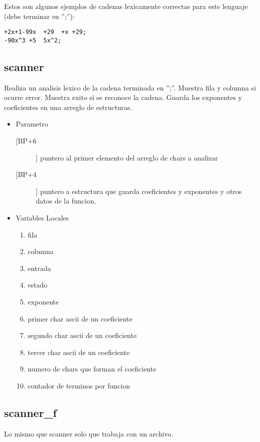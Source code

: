 Estos son algunos ejemplos de cadenas lexicamente correctas para este
lenguaje (debe terminar en '';''):
\begin{verbatim}
+2x+1-99x  +29  +x +29;
-90x^3 +5  5x^2;
\end{verbatim}


\subsection{scanner}
\label{sec-2-1}

Realiza un analisis lexico de la cadena terminada en '';''. Muestra fila
y columna si ocurre error. Muestra exito si se reconoce la
cadena. Guarda los exponentes y coeficientes en una arreglo de
estructuras.

\begin{itemize}
\item Parametro
\begin{description}
\item[[BP+6]] puntero al primer elemento del arreglo de chars a
analizar
\item[[BP+4]] puntero a estructura que guarda coeficientes y
exponentes y otros datos de la funcion.
\end{description}
\item Variables Locales
\begin{enumerate}
\item\relax [BP-2]  fila
\item\relax [BP-4]  columna
\item\relax [BP-6]  entrada
\item\relax [BP-8]  estado
\item\relax [BP-0xA]  exponente
\item\relax [BP-0xC]  primer char ascii de un coeficiente
\item\relax [BP-0xE]  segundo char ascii de un coeficiente
\item\relax [BP-0x10]  tercer char ascii de un coeficiente
\item\relax [BP-0x12]  numero de chars que forman el coeficiente
\item\relax [BP-0x14] contador de terminos por funcion
\end{enumerate}
\end{itemize}


\subsection{scanner\_f}
\label{sec-2-2}
Lo mismo que scanner solo que trabaja con un archivo.

